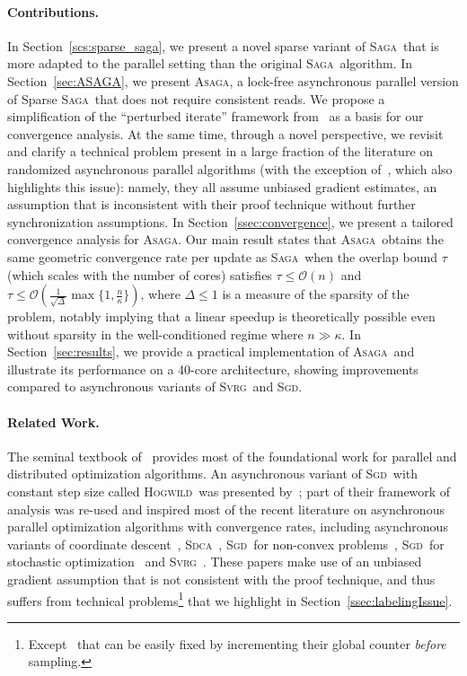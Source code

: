 \documentclass[twoside]{article}
\newcommand{\overlap}{\tau}
\newcommand{\sparsity}{\Delta}
\newcommand{\ASAGA}{\textsc{Asaga}}
\newcommand{\SAGA}{\textsc{Saga}}
\newcommand{\SVRG}{\textsc{Svrg}}
\newcommand{\Hogwild}{\textsc{Hogwild}}
\newcommand{\SDCA}{\textsc{Sdca}}
\newcommand{\SGD}{\textsc{Sgd}}
\begin{document}
\vspace{-2mm}
\paragraph{Contributions.} In Section~\ref{scs:sparse_saga}, we present a novel sparse variant of \SAGA\ that is more adapted to the parallel setting than the original \SAGA\ algorithm. 
In Section~\ref{sec:ASAGA}, we present \ASAGA, a lock-free asynchronous parallel version of Sparse \SAGA\ that does not require consistent reads. 
We propose a simplification of the ``perturbed iterate'' framework from~\citet{mania} as a basis for our convergence analysis. 
At the same time, through a novel perspective, we revisit and clarify a technical problem present in a large fraction of the literature on randomized asynchronous parallel algorithms (with the exception of~\citet{mania}, which also highlights this issue): namely, they all assume unbiased gradient estimates, an assumption that is inconsistent with their proof technique without further synchronization assumptions. 
In Section~\ref{ssec:convergence}, we present a tailored convergence analysis for \ASAGA. Our main result states that \ASAGA\ obtains the same geometric convergence rate per update as \SAGA\ when the overlap bound $\overlap$ (which scales with the number of cores) satisfies
$\overlap \leq \mathcal{O}(n)$ and $\overlap \leq \mathcal{O}({\scriptstyle \frac{1}{\sqrt{\sparsity}}} \max\{1,\frac{n}{\kappa} \})$, where $\sparsity \leq 1$ is a measure of the sparsity of the problem, notably implying that a linear speedup is theoretically possible even without sparsity in the well-conditioned regime where $n \gg \kappa$.
In Section~\ref{sec:results}, we provide a practical implementation of \ASAGA\ and illustrate its performance on a 40-core architecture, showing improvements compared to asynchronous variants of \SVRG\ and \SGD.

\vspace{-2mm}
\paragraph{Related Work.}
The seminal textbook of~\citet{bertsekasParalle1989} provides most of the foundational work for parallel and distributed optimization algorithms. 
An asynchronous variant of \SGD\ with constant step size called \Hogwild\ was presented by~\citet{hogwild}; part of their framework of analysis was re-used and inspired most of the recent literature on asynchronous parallel optimization algorithms with convergence rates, including asynchronous variants of coordinate descent~\citep{asyncCD2015}, \SDCA~\citep{asyncSDCA2015}, \SGD\ for non-convex problems~\citep{taming,asyncSGDNonConvex2015}, \SGD\ for stochastic optimization~\citep{duchi} and \SVRG~\citep{smola,asySVRG}. 
These papers make use of an unbiased gradient assumption that is not consistent with the proof technique, and thus suffers from technical problems\footnote{Except~\citet{duchi} that can be easily fixed by incrementing their global counter \emph{before} sampling.} that we highlight in Section~\ref{ssec:labelingIssue}. 
\end{document}
